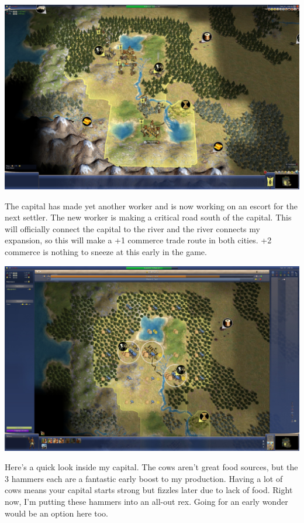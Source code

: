 \documentclass[10pt]{article}
\begin{document}
\includegraphics[width=1.0\textwidth]{14}

The capital has made yet another worker and is now working on an escort for the next settler. The new worker
is making a critical road south of the capital. This will officially connect the capital to the river and
the river connects my expansion, so this will make a +1 commerce trade route in both cities. +2 commerce
is nothing to sneeze at this early in the game.

\includegraphics[width=1.0\textwidth]{15}

Here's a quick look inside my capital. The cows aren't great food sources, but the 3 hammers each are
a fantastic early boost to my production. Having a lot of cows means your capital starts strong but
fizzles later due to lack of food. Right now, I'm putting these hammers into an all-out rex. Going for
an early wonder would be an option here too.
\end{document}
